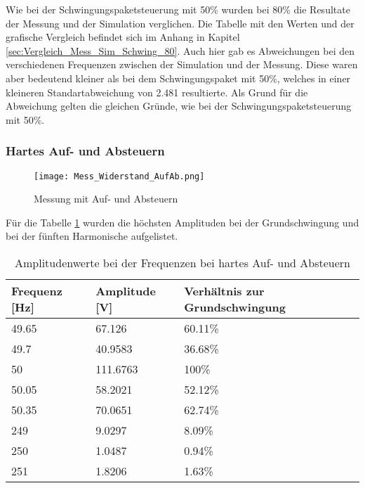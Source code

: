Wie bei der Schwingungspaketsteuerung mit 50\% wurden bei 80\% die Resultate der Messung und der Simulation verglichen. Die Tabelle mit den Werten und der grafische Vergleich befindet sich im Anhang in Kapitel \ref{sec:Vergleich_Mess_Sim_Schwing_80}. Auch hier gab es Abweichungen bei den verschiedenen Frequenzen zwischen der Simulation und der Messung. Diese waren aber bedeutend kleiner als bei dem Schwingungspaket mit 50\%, welches in einer kleineren Standartabweichung von 2.481 resultierte. Als Grund für die Abweichung gelten die gleichen Gründe, wie bei der Schwingungspaketsteuerung mit 50\%.



\newpage
\subsubsection*{Hartes Auf- und Absteuern}
\begin{figure}[ht!]
	\centering
	\texttt{[image: Mess\_Widerstand\_AufAb.png]}	
	\caption{Messung mit Auf- und Absteuern}\label{fig:Mess_Sanft}
\end{figure}

Für die Tabelle \ref{tab:Mess_Spannung_AufAb_hart} wurden die höchsten Amplituden bei der Grundschwingung und bei der fünften Harmonische aufgelistet.

\begin{table}[ht!]
	\centering
	\begin{tabular}{|l|l|l|}
		\hline
		Frequenz {[}Hz{]} & Amplitude {[}V{]} & Verhältnis zur Grundschwingung \\ \hline
		49.65             & 67.126            & 60.11\%                        \\ \hline
		49.7              & 40.9583           & 36.68\%                        \\ \hline
		50                & 111.6763          & 100\%                          \\ \hline
		50.05             & 58.2021           & 52.12\%                        \\ \hline
		50.35             & 70.0651           & 62.74\%                        \\ \hline
		249               & 9.0297            & 8.09\%                         \\ \hline
		250               & 1.0487            & 0.94\%                         \\ \hline
		251 		      & 1.8206            & 1.63\%                         \\ \hline
	\end{tabular}
\caption{Amplitudenwerte bei der Frequenzen bei hartes Auf- und Absteuern}\label{tab:Mess_Spannung_AufAb_hart}
\end{table}

